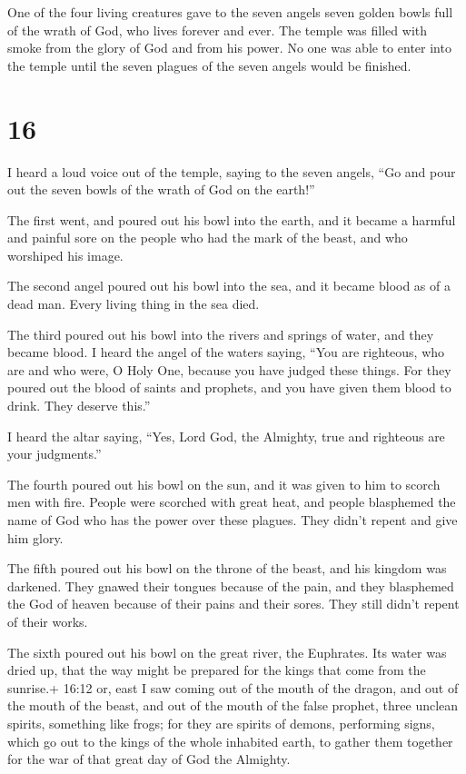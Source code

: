  One of the four living creatures gave to the seven angels
seven golden bowls full of the wrath of God, who lives forever and ever.
 The temple was filled with smoke from the glory of God and
from his power. No one was able to enter into the temple until the seven
plagues of the seven angels would be finished.

\hypertarget{section-15}{%
\section{16}\label{section-15}}

 I heard a loud voice out of the temple, saying to the seven
angels, ``Go and pour out the seven bowls of the wrath of God on the
earth!''

 The first went, and poured out his bowl into the earth, and
it became a harmful and painful sore on the people who had the mark of
the beast, and who worshiped his image.

 The second angel poured out his bowl into the sea, and it
became blood as of a dead man. Every living thing in the sea died.

 The third poured out his bowl into the rivers and springs
of water, and they became blood.  I heard the angel of the
waters saying, ``You are righteous, who are and who were, O Holy One,
because you have judged these things.  For they poured out
the blood of saints and prophets, and you have given them blood to
drink. They deserve this.''

 I heard the altar saying, ``Yes, Lord God, the Almighty,
true and righteous are your judgments.''

 The fourth poured out his bowl on the sun, and it was given
to him to scorch men with fire.  People were scorched with
great heat, and people blasphemed the name of God who has the power over
these plagues. They didn't repent and give him glory.

 The fifth poured out his bowl on the throne of the beast,
and his kingdom was darkened. They gnawed their tongues because of the
pain,  and they blasphemed the God of heaven because of
their pains and their sores. They still didn't repent of their works.

 The sixth poured out his bowl on the great river, the
Euphrates. Its water was dried up, that the way might be prepared for
the kings that come from the sunrise.+ 16:12 or, east  I
saw coming out of the mouth of the dragon, and out of the mouth of the
beast, and out of the mouth of the false prophet, three unclean spirits,
something like frogs;  for they are spirits of demons,
performing signs, which go out to the kings of the whole inhabited
earth, to gather them together for the war of that great day of God the
Almighty.

